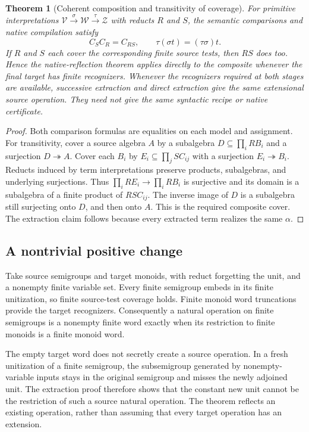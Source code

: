 \documentclass[11pt]{article}
\newtheorem{theorem}{Theorem}[section]
\theoremstyle{definition}
\theoremstyle{remark}
\begin{document}
\begin{theorem}[Coherent composition and transitivity of coverage]
\label{alg-thm:composition}
For primitive interpretations
$\mathcal V\xrightarrow{\sigma}\mathcal W
\xrightarrow{\tau}\mathcal Z$ with reducts $R$ and $S$, the semantic
comparisons and native compilation satisfy
\[
                     C_S C_R=C_{RS},
             \qquad \tau(\sigma t)=(\tau\sigma)t.
\]
If $R$ and $S$ each cover the corresponding finite source tests, then
$RS$ does too. Hence the native-reflection theorem applies directly to
the composite whenever the final target has finite recognizers.
Whenever the recognizers required at both stages are available,
successive extraction and direct extraction give the same extensional
source operation. They need not give the same syntactic recipe or native
certificate.
\end{theorem}
\begin{proof}
Both comparison formulas are equalities on each model and assignment.
For transitivity, cover a source algebra $A$ by a subalgebra
$D\subseteq\prod_i RB_i$ and a surjection $D\twoheadrightarrow A$.
Cover each $B_i$ by $E_i\subseteq\prod_j SC_{ij}$ with a surjection
$E_i\twoheadrightarrow B_i$. Reducts induced by term interpretations
preserve products, subalgebras, and underlying surjections. Thus
$\prod_i RE_i\to\prod_i RB_i$ is surjective and its domain is a
subalgebra of a finite product of $RSC_{ij}$.
The inverse image of $D$ is a subalgebra still surjecting onto $D$, and
then onto $A$. This is the required composite cover. The extraction
claim follows because every extracted term realizes the same $\alpha$.
\end{proof}

\subsection{A nontrivial positive change}
Take source semigroups and target monoids, with reduct forgetting the
unit, and a nonempty finite variable set. Every finite semigroup embeds
in its finite unitization, so finite source-test coverage holds.
Finite monoid word truncations provide the target recognizers.
Consequently a natural operation on finite semigroups is a nonempty
finite word exactly when its restriction to finite monoids is a finite
monoid word.

The empty target word does not secretly create a source operation.
In a fresh unitization of a finite semigroup, the subsemigroup generated
by nonempty-variable inputs stays in the original semigroup and misses
the newly adjoined unit. The extraction proof therefore shows that the
constant new unit cannot be the restriction of such a source natural
operation. The theorem reflects an existing operation, rather than
assuming that every target operation has an extension.
\end{document}
